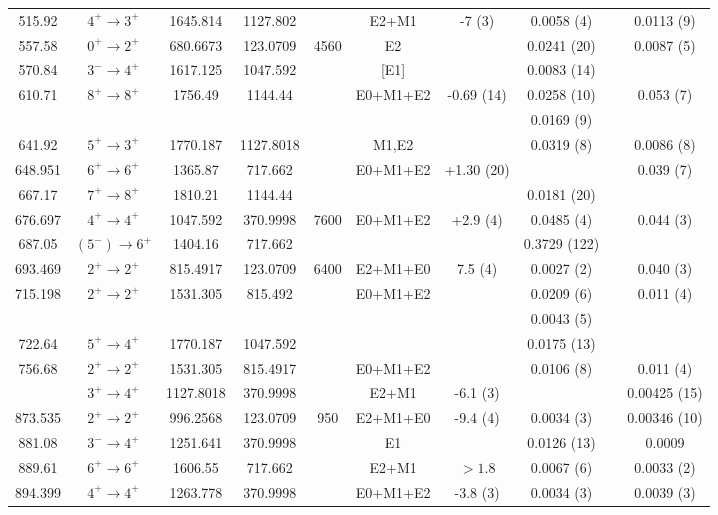 \begin{landscape}
\begin{longtable}{c|c|c|c|c|c|c|c|c|c}
515.92	&	$4^+	\rightarrow	3^+$	&	1645.814	&	1127.802	&		&	E2+M1	&	-7 (3)	&	0.0058	(4)	&		&	0.0113 (9)	\\
557.58	&	$0^+	\rightarrow	2^+$	&	680.6673	&	123.0709	&	4560	&	E2	&		&	0.0241	(20)	&		&	0.0087 (5)	\\
570.84	&	$3^-	\rightarrow	4^+$	&	1617.125	&	1047.592	&		&	[E1]	&		&	0.0083	(14)	&		&		\\
610.71	&	$8^+	\rightarrow	8^+$	&	1756.49	&	1144.44	&		&	E0+M1+E2	&	-0.69 (14)	&	0.0258	(10)	&		&	0.053 (7)	\\
	&				&		&		&		&		&		&	0.0169	(9)	&		&		\\
641.92	&	$5^+	\rightarrow	3^+$	&	1770.187	&	1127.8018	&		&	M1,E2	&		&	0.0319 (8)	&		&	0.0086 (8)	\\
648.951	&	$6^+	\rightarrow	6^+$	&	1365.87	&	717.662	&		&	E0+M1+E2	&	+1.30 (20)	&		&		&	0.039 (7)	\\
667.17	&	$7^+	\rightarrow	8^+$	&	1810.21	&	1144.44	&		&		&		&	0.0181	(20)	&		&		\\
676.697	&	$4^+	\rightarrow	4^+$	&	1047.592	&	370.9998	&	7600	&	E0+M1+E2	&	+2.9 (4)	&	0.0485	(4)	&		&	0.044 (3)	\\
687.05	&	$(5^-) \rightarrow 6^+$		&	1404.16	    &	717.662 	&		&		&		&	0.3729	(122)	&		&		\\
693.469	&	$2^+	\rightarrow	2^+$	&	815.4917	&	123.0709	&	6400	&	E2+M1+E0	&	7.5 (4)	&	0.0027	(2)	&		&	0.040 (3)	\\
715.198	&	$2^+	\rightarrow	2^+$	&	1531.305	&	815.492	&		&	E0+M1+E2	&		&	0.0209	(6)	&		&	0.011 (4)	\\
	&				&		&		&		&		&		&	0.0043	(5)	&		&		\\
722.64	&	$5^+	\rightarrow	4^+$	&	1770.187	&	1047.592	&		&		&		&	0.0175	(13)	&		&		\\
756.68	&	$2^+	\rightarrow	2^+$	&	1531.305	&	815.4917	&		&	E0+M1+E2	&		&	0.0106	(8)	&		&	0.011 (4)	\\
	&	$3^+	\rightarrow	4^+$	&	1127.8018	&	370.9998	&		&	E2+M1	&	-6.1 (3)	&					&		&	0.00425 (15)	\\
873.535	&	$2^+	\rightarrow	2^+$	&	996.2568	&	123.0709	&	950	&	E2+M1+E0	&	-9.4 (4)	&	0.0034	(3)	&		&	0.00346 (10)	\\
881.08	&	$3^-	\rightarrow	4^+$	&	1251.641	&	370.9998	&		&	E1	&		&	0.0126	(13)	&		&	0.0009	\\
889.61	&	$6^+	\rightarrow	6^+$	&	1606.55	&	717.662	&		&	E2+M1	&	$>1.8$	&	0.0067	(6)	&		&	0.0033 (2)	\\
894.399	&	$4^+	\rightarrow	4^+$	&	1263.778	&	370.9998	&		&	E0+M1+E2	&	-3.8 (3)	&	0.0034	(3)	&		&	0.0039 (3)	\\

\end{longtable}
\end{landscape}
